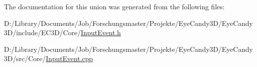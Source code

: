 The documentation for this union was generated from the following files\+:\begin{DoxyCompactItemize}
\item 
D\+:/\+Library/\+Documents/\+Job/\+Forschungsmaster/\+Projekte/\+Eye\+Candy3\+D/\+Eye\+Candy3\+D/include/\+E\+C3\+D/\+Core/\mbox{\hyperlink{_input_event_8h}{Input\+Event.\+h}}\item 
D\+:/\+Library/\+Documents/\+Job/\+Forschungsmaster/\+Projekte/\+Eye\+Candy3\+D/\+Eye\+Candy3\+D/src/\+Core/\mbox{\hyperlink{_input_event_8cpp}{Input\+Event.\+cpp}}\end{DoxyCompactItemize}
